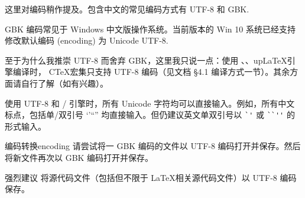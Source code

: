 这里对编码稍作提及。包含中文的常见编码方式有 UTF-8 和 GBK.

GBK 编码常见于 Windows 中文版操作系统。当前版本的 Win 10 系统已经支持修改默认编码 (encoding) 为 Unicode UTF-8.

至于为什么我推崇 UTF-8 而舍弃 GBK，这里我只说一点：使用 、、up\LaTeX 引擎编译时， C\TeX 宏集只支持 UTF-8 编码（见文档 \cite{ctex} \S 4.1 编译方式一节）。其余方面请自行了解（如有兴趣）。

使用 UTF-8 和 / 引擎时，所有 Unicode 字符均可以直接输入。例如，所有中文标点，包括单/双引号 ‘’“” 均直接输入。但仍建议英文单双引号以 \verb|`'| 或 \verb|``''| 的形式输入。

\begin{Ex}{编码转换}{encoding}
请尝试将一 GBK 编码的文件以 UTF-8 编码打开并保存。然后将新文件再次以 GBK 编码打开并保存。
\end{Ex}

\begin{notice}{强烈建议}
将源代码文件（包括但不限于 \LaTeX 相关源代码文件）以 UTF-8 编码保存。
\end{notice}